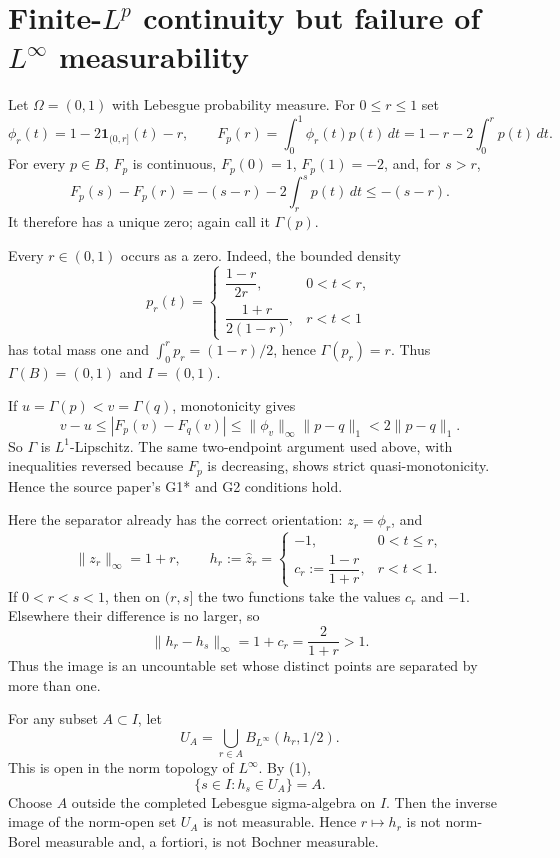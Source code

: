 \documentclass[11pt]{article}
\newcommand{\1}{\mathbf 1}
\begin{document}
\section{Finite-\texorpdfstring{$L^p$}{Lp} continuity but failure of
\texorpdfstring{$L^\infty$}{L-infinity} measurability}

Let $\Omega=(0,1)$ with Lebesgue probability measure.  For $0\leq r\leq1$ set
\[
 \phi_r(t)=1-2\1_{(0,r]}(t)-r,
 \qquad
 F_p(r)=\int_0^1\phi_r(t)p(t)\,dt
       =1-r-2\int_0^r p(t)\,dt.
\]
For every $p\in B$, $F_p$ is continuous,
$F_p(0)=1$, $F_p(1)=-2$, and, for $s>r$,
\[
 F_p(s)-F_p(r)=-(s-r)-2\int_r^s p(t)\,dt\leq-(s-r).
\]
It therefore has a unique zero; again call it $\Gamma(p)$.

Every $r\in(0,1)$ occurs as a zero.  Indeed, the bounded density
\[
 p_r(t)=
 \begin{cases}
 \dfrac{1-r}{2r},&0<t<r,\\[4pt]
 \dfrac{1+r}{2(1-r)},&r<t<1
 \end{cases}
\]
has total mass one and $\int_0^r p_r=(1-r)/2$, hence
$\Gamma(p_r)=r$.  Thus $\Gamma(B)=(0,1)$ and $I=(0,1)$.

If $u=\Gamma(p)<v=\Gamma(q)$, monotonicity gives
\[
 v-u\leq |F_p(v)-F_q(v)|
 \leq \|\phi_v\|_\infty\|p-q\|_1
 <2\|p-q\|_1.
\]
So $\Gamma$ is $L^1$-Lipschitz.  The same two-endpoint argument used above,
with inequalities reversed because $F_p$ is decreasing, shows strict
quasi-monotonicity.  Hence the source paper's G1* and G2 conditions hold.

Here the separator already has the correct orientation: $z_r=\phi_r$, and
\[
 \|z_r\|_\infty=1+r,
 \qquad
 h_r:=\widehat z_r=
 \begin{cases}
 -1,&0<t\leq r,\\[2pt]
 c_r:=\dfrac{1-r}{1+r},&r<t<1.
 \end{cases}
\]
If $0<r<s<1$, then on $(r,s]$ the two functions take the values $c_r$ and
$-1$.  Elsewhere their difference is no larger, so
\[
 \|h_r-h_s\|_\infty=1+c_r=\frac{2}{1+r}>1.\tag{1}
\]
Thus the image is an uncountable set whose distinct points are separated by
more than one.

For any subset $A\subset I$, let
\[
 U_A=\bigcup_{r\in A}B_{L^\infty}(h_r,1/2).
\]
This is open in the norm topology of $L^\infty$.  By (1),
\[
 \{s\in I:h_s\in U_A\}=A.
\]
Choose $A$ outside the completed Lebesgue sigma-algebra on $I$.  Then the
inverse image of the norm-open set $U_A$ is not measurable.  Hence
$r\mapsto h_r$ is not norm-Borel measurable and, a fortiori, is not Bochner
measurable.
\end{document}
